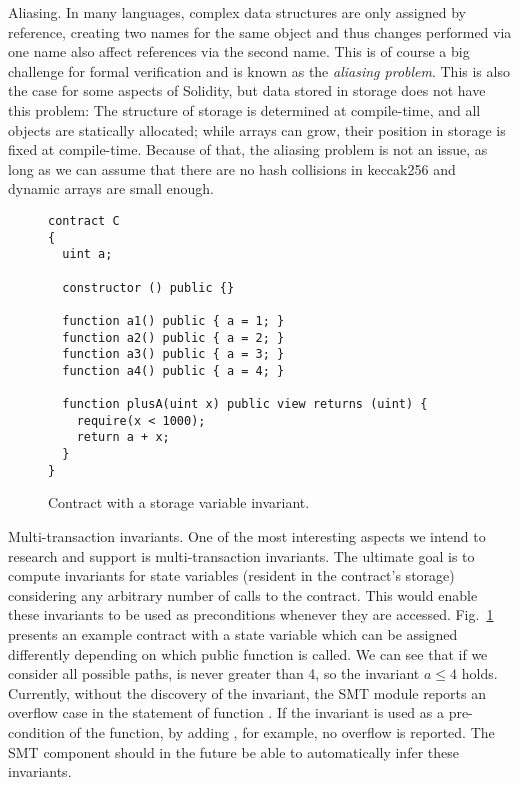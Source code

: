 \begin{paragraph}{Aliasing.}
In many languages, complex data structures are only assigned by
reference, creating two names for the same object and thus changes
performed via one name also affect references via the second name.
This is of course a big challenge for formal verification and
is known as the \emph{aliasing problem}.
This is also the case for some aspects of Solidity, but data stored
in storage does not have this problem: The structure of
storage is determined at compile-time, and all objects are
statically allocated; while arrays can grow, their position in
storage is fixed at compile-time. Because of that, the aliasing problem
is not an issue, as long as we can assume that there are no hash
collisions in keccak256 and dynamic arrays are small enough.
\end{paragraph}

\begin{figure}[h]
\begin{verbatim}
contract C
{
  uint a;

  constructor () public {}

  function a1() public { a = 1; }
  function a2() public { a = 2; }
  function a3() public { a = 3; }
  function a4() public { a = 4; }

  function plusA(uint x) public view returns (uint) {
    require(x < 1000);
    return a + x;
  }
}
\end{verbatim}
\caption{Contract with a storage variable invariant.}
\label{fig:invariant_a}
\end{figure}

\begin{paragraph}{Multi-transaction invariants.}
One of the most interesting aspects we intend to research and support is
multi-transaction invariants.
%
The ultimate goal is to compute invariants for state variables (resident in the
contract's storage) considering any arbitrary number of calls to the contract.
%
This would enable these invariants to be used as preconditions whenever they
are accessed.
%
Fig.~\ref{fig:invariant_a} presents an example contract with a state variable
 which can be assigned differently depending on which public function
is called.
%
We can see that if we consider all possible paths,  is never greater
than 4, so the invariant $a \le 4$ holds.
%
Currently, without the discovery of the invariant, the SMT module reports an
overflow case in the  statement of function .
%
If the invariant is used as a pre-condition of the function, by adding
, for example, no overflow is reported.
%
The SMT component should in the future be able to automatically infer these
invariants.

\end{paragraph}

